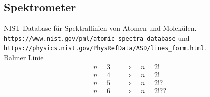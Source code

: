 \subsection{Spektrometer}

\hft
{}

NIST Database für Spektrallinien von Atomen und Molekülen. \texttt{https://www.nist.gov/pml/atomic-spectra-database} und \verb|https://physics.nist.gov/PhysRefData/ASD/lines_form.html|.\\[10pt]
\noindent
Balmer Linie
\begin{align*}
n = 3 \quad &\Rightarrow \quad n = 2 ! \\
n = 4 \quad &\Rightarrow \quad n = 2 ! \\
n = 5 \quad &\Rightarrow \quad n = 2 !? \\
n = 6 \quad &\Rightarrow \quad n = 2 !?? \\
\end{align*}
\\

